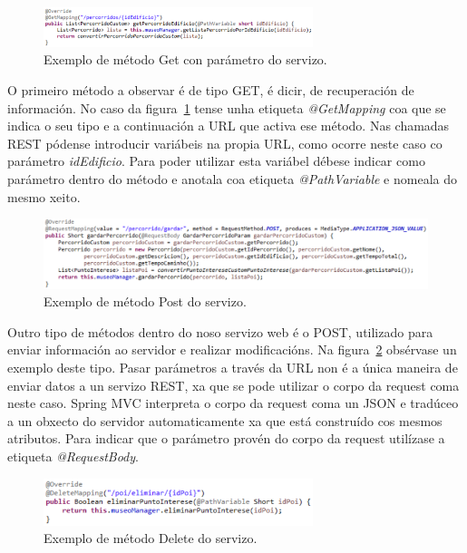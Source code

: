 \begin{figure}[tbh] 
	\begin{center}
		\includegraphics[width=0.7\textwidth]{figures/codigo/chamadaServizoGetParametro}
		\caption{Exemplo de método Get con parámetro do servizo.}
		\label{fig:chamadaServizoGetParametro}
	\end{center}
\end{figure}

O primeiro método a observar é de tipo GET, é dicir, de recuperación de información. No caso da figura~\ref{fig:chamadaServizoGetParametro} tense unha etiqueta \emph{@GetMapping} coa que se indica o seu tipo e a continuación a URL que activa ese método. Nas chamadas REST pódense introducir variábeis na propia URL, como ocorre neste caso co parámetro \emph{idEdificio}. Para poder utilizar esta variábel débese indicar como parámetro dentro do método e anotala coa etiqueta \emph{@PathVariable} e nomeala do mesmo xeito.

\begin{figure}[tbh] 
	\begin{center}
		\includegraphics[width=1\textwidth]{figures/codigo/chamadaServizoPost}
		\caption{Exemplo de método Post do servizo.}
		\label{fig:chamadaServizoPost}
	\end{center}
\end{figure}

Outro tipo de métodos dentro do noso servizo web é o POST, utilizado para enviar información ao servidor e realizar modificacións. Na figura~\ref{fig:chamadaServizoPost} obsérvase un exemplo deste tipo. Pasar parámetros a través da URL non é a única maneira de enviar datos a un servizo REST, xa que se pode utilizar o corpo da request coma neste caso. Spring MVC interpreta o corpo da request coma un JSON e tradúceo a un obxecto do servidor automaticamente xa que está construído cos mesmos atributos. Para indicar que o parámetro provén do corpo da request utilízase a etiqueta \emph{@RequestBody}.

\begin{figure}[tbh] 
	\begin{center}
		\includegraphics[width=0.7\textwidth]{figures/codigo/chamadaServizoDelete}
		\caption{Exemplo de método Delete do servizo.}
		\label{fig:chamadaServizoDelete}
	\end{center}
\end{figure}

